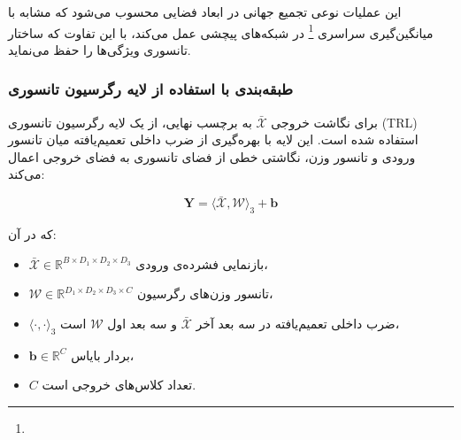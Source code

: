 این عملیات نوعی تجمیع جهانی در ابعاد فضایی محسوب می‌شود که مشابه با میانگین‌گیری سراسری \footnote{}  در شبکه‌های پیچشی عمل می‌کند، با این تفاوت که ساختار تانسوری ویژگی‌ها را حفظ می‌نماید.

\subsubsection*{طبقه‌بندی با استفاده از لایه رگرسیون تانسوری}

برای نگاشت خروجی $\bar{\mathcal{X}}$ به برچسب نهایی، از یک لایه رگرسیون تانسوری (TRL) استفاده شده است. این لایه با بهره‌گیری از ضرب داخلی تعمیم‌یافته میان تانسور ورودی و تانسور وزن، نگاشتی خطی از فضای تانسوری به فضای خروجی اعمال می‌کند:

\[
\mathbf{Y} = \langle \bar{\mathcal{X}}, \mathcal{W} \rangle_3 + \mathbf{b}
\]

که در آن:
\begin{itemize}
	\item $\bar{\mathcal{X}} \in \mathbb{R}^{B \times D_1 \times D_2 \times D_3}$ بازنمایی فشرده‌ی ورودی،
	\item $\mathcal{W} \in \mathbb{R}^{D_1 \times D_2 \times D_3 \times C}$ تانسور وزن‌های رگرسیون،
	\item $\langle \cdot, \cdot \rangle_3$ ضرب داخلی تعمیم‌یافته در سه بعد آخر $\bar{\mathcal{X}}$ و سه بعد اول $\mathcal{W}$ است،
	\item $\mathbf{b} \in \mathbb{R}^{C}$ بردار بایاس،
	\item $C$ تعداد کلاس‌های خروجی است.
\end{itemize}










